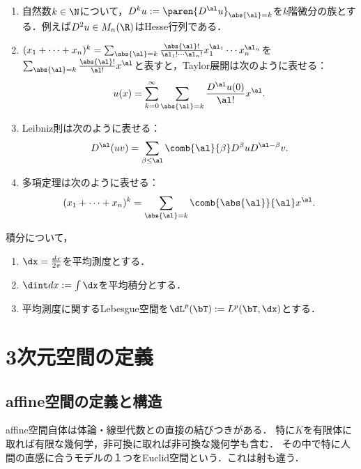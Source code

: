 \documentclass[uplatex,dvipdfmx]{jsreport}
\begin{document}
\begin{notation}
\begin{enumerate}
        \item 自然数$k\in\N$について，$D^ku:=\paren{D^\al u}_{\abs{\al}=k}$を$k$階微分の族とする．例えば$D^2u\in M_n(\R)$はHesse行列である．
        \item $(x_1+\cdots+x_n)^k=\sum_{\abs{\al}=k}\frac{\abs{\al}!}{\al_1!\cdots\al_n!}x_1^{\al_1}\cdots x_n^{\al_n}$を$\sum_{\abs{\al}=k}\frac{\abs{\al}!}{\al!}x^\al$と表すと，Taylor展開は次のように表せる：
        \[u(x)=\sum_{k=0}^\infty\sum_{\abs{\al}=k}\frac{D^\al u(0)}{\al!}x^\al.\]
        \item Leibniz則は次のように表せる：
        \[D^\al(uv)=\sum_{\beta\le\al}\comb{\al}{\beta}D^\beta uD^{\al-\beta}v.\]
        \item 多項定理は次のように表せる：
        \[(x_1+\cdots+x_n)^k=\sum_{\abs{\al}=k}\comb{\abs{\al}}{\al}x^\al.\]
    \end{enumerate}
    積分について，
    \begin{enumerate}
        \item $\dx=\frac{dx}{2\pi}$を平均測度とする．
        \item $\dint dx:=\int\dx$を平均積分とする．
        \item 平均測度に関するLebesgue空間を$\dL^p(\bT):= L^p(\bT,\dx)$とする．
    \end{enumerate}
\end{notation}

\section{3次元空間の定義}

\subsection{affine空間の定義と構造}

\begin{tcolorbox}[colframe=ForestGreen, colback=ForestGreen!10!white,breakable,colbacktitle=ForestGreen!40!white,coltitle=black,fonttitle=\bfseries\sffamily,
title=]
    affine空間自体は体論・線型代数との直接の結びつきがある．
    特に$K$を有限体に取れば有限な幾何学，非可換に取れば非可換な幾何学も含む．
    その中で特に人間の直感に合うモデルの１つをEuclid空間という．これは射も違う．
\end{tcolorbox}
\end{document}
